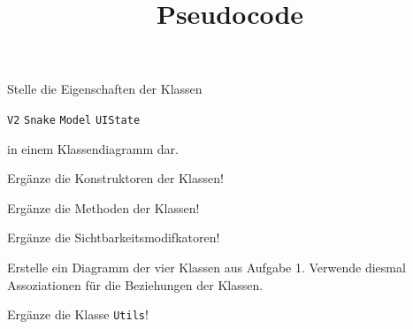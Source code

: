 \documentclass[a4paper,DIV =14]{scrartcl}
\date{}
\title{Pseudocode}
\begin{document}
\begin{aufgabe}
Stelle die Eigenschaften der Klassen

\begin{teilaufgaben}
 \teilaufgabe \texttt{V2}
 \teilaufgabe \texttt{Snake}
 \teilaufgabe \texttt{Model}
 \teilaufgabe \texttt{UIState}
\end{teilaufgaben}
in einem Klassendiagramm dar.
\end{aufgabe}

\begin{aufgabe}
Ergänze die Konstruktoren der Klassen!
\end{aufgabe}


\begin{aufgabe}
Ergänze die Methoden der Klassen!
\end{aufgabe}


\begin{aufgabe}
Ergänze die Sichtbarkeitsmodifkatoren!
\end{aufgabe}


\begin{aufgabe}
Erstelle ein Diagramm der vier Klassen aus Aufgabe 1. Verwende diesmal Assoziationen für die Beziehungen der Klassen.

\end{aufgabe}

\begin{aufgabe}
Ergänze die Klasse \texttt{Utils}!
\end{aufgabe}
\end{document}
